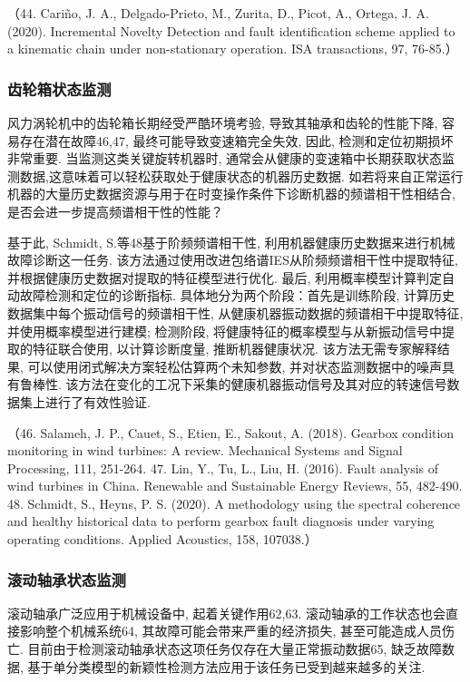 \documentclass{Style/aas}
\begin{document}
\begin{multicols}{2}
  （44.	Cariño, J. A., Delgado-Prieto, M., Zurita, D., Picot, A., Ortega, J. A. (2020). Incremental Novelty Detection and fault identification scheme applied to a kinematic chain under non-stationary operation. ISA transactions, 97, 76-85.）

  \subsubsection{齿轮箱状态监测}

  风力涡轮机中的齿轮箱长期经受严酷环境考验, 导致其轴承和齿轮的性能下降, 容易存在潜在故障46,47, 最终可能导致变速箱完全失效, 因此, 检测和定位初期损坏非常重要. 当监测这类关键旋转机器时, 通常会从健康的变速箱中长期获取状态监测数据,这意味着可以轻松获取处于健康状态的机器历史数据. 如若将来自正常运行机器的大量历史数据资源与用于在时变操作条件下诊断机器的频谱相干性相结合, 是否会进一步提高频谱相干性的性能？

  基于此, Schmidt, S.等48基于阶频频谱相干性, 利用机器健康历史数据来进行机械故障诊断这一任务. 该方法通过使用改进包络谱IES从阶频频谱相干性中提取特征, 并根据健康历史数据对提取的特征模型进行优化. 最后, 利用概率模型计算判定自动故障检测和定位的诊断指标. 具体地分为两个阶段：首先是训练阶段, 计算历史数据集中每个振动信号的频谱相干性, 从健康机器振动数据的频谱相干中提取特征, 并使用概率模型进行建模; 检测阶段, 将健康特征的概率模型与从新振动信号中提取的特征联合使用, 以计算诊断度量, 推断机器健康状况. 该方法无需专家解释结果, 可以使用闭式解决方案轻松估算两个未知参数, 并对状态监测数据中的噪声具有鲁棒性. 该方法在变化的工况下采集的健康机器振动信号及其对应的转速信号数据集上进行了有效性验证.

  （46.	Salameh, J. P., Cauet, S., Etien, E., Sakout, A. (2018). Gearbox condition monitoring in wind turbines: A review. Mechanical Systems and Signal Processing, 111, 251-264.
  47.	Lin, Y., Tu, L., Liu, H. (2016). Fault analysis of wind turbines in China. Renewable and Sustainable Energy Reviews, 55, 482-490.
  48.	Schmidt, S., Heyns, P. S. (2020). A methodology using the spectral coherence and healthy historical data to perform gearbox fault diagnosis under varying operating conditions. Applied Acoustics, 158, 107038.）

  \subsubsection{滚动轴承状态监测}

  滚动轴承广泛应用于机械设备中, 起着关键作用62,63. 滚动轴承的工作状态也会直接影响整个机械系统64, 其故障可能会带来严重的经济损失, 甚至可能造成人员伤亡. 目前由于检测滚动轴承状态这项任务仅存在大量正常振动数据65, 缺乏故障数据, 基于单分类模型的新颖性检测方法应用于该任务已受到越来越多的关注.


\end{multicols}
\end{document}

